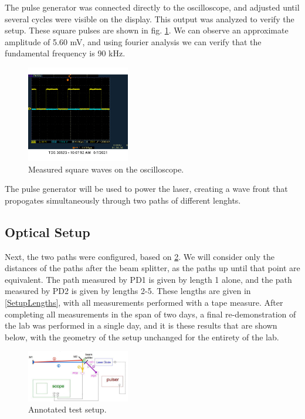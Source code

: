 \documentclass[aps,prl,reprint]{revtex4-2}
\begin{document}
The pulse generator was connected directly to the oscilloscope, and adjusted until
several cycles were visible on the display. This output was analyzed to verify the setup.
These square pulses are shown in fig. \ref{squares}. We can observe an approximate 
amplitude of 5.60 mV, and using fourier analysis we can verify that the fundamental 
frequency is 90 kHz. \\

\begin{figure}[h]
\includegraphics[width=0.4\textwidth]{./BMPs/l4_A_1.jpg}
\caption{\label{squares} Measured square waves on the oscilloscope.}
\end{figure}

The pulse generator will be used to power the laser, creating a wave
front that propogates simultaneously through two paths of different lenghts. \\


\subsection{Optical Setup}

Next, the two paths were configured, based on \ref{setup}. We will consider only the
distances of the paths after the beam splitter, as the paths up until that point are
equivalent. The path measured by PD1 is given by length 1 alone, and the path measured
by PD2 is given by lengths 2-5. These lengths are given in \ref{SetupLengths}, with
all measurements performed with a tape measure.
After completing all measurements in the span of two days,
a final re-demonstration of the lab was performed in a single day, and it is these results
that are shown below, with the geometry of the setup unchanged for the entirety of the 
lab. \\

\begin{figure}[h]
\includegraphics[width=0.4\textwidth]{./BMPs/Optical Setup.jpg}
\caption{\label{setup} Annotated test setup.}
\end{figure}
\end{document}
